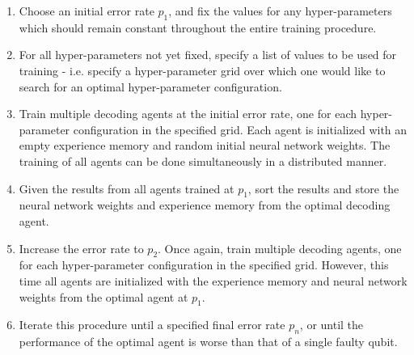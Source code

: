 \documentclass[twocolumn,preprintnumbers,amsmath,amssymb,notitlepage,nofootinbib,longbibliography,superscriptaddress,aps,pra,10pt]{revtex4-1}
\begin{document}
	\begin{enumerate}
		\item Choose an initial error rate $p_1$, and fix the values for any hyper-parameters which should remain constant throughout the entire training procedure.
		\item For all hyper-parameters not yet fixed, specify a list of values to be used for training - i.e. specify a hyper-parameter grid over which one would like to search for an optimal hyper-parameter configuration.
		\item Train multiple decoding agents at the initial error rate, one for each hyper-parameter configuration in the specified grid. Each agent is initialized with an empty experience memory and random initial neural network weights. The training of all agents can be done simultaneously in a distributed manner.
		\item Given the results from all agents trained at $p_1$, sort the results and store the neural network weights and experience memory from the optimal decoding agent.
		\item Increase the error rate to $p_2$. Once again, train multiple decoding agents, one for each hyper-parameter configuration in the specified grid. However, this time all agents are initialized with the experience memory and neural network weights from the optimal agent at $p_1$.
		\item Iterate this procedure until a specified final error rate $p_n$, or until the performance of the optimal agent is worse than that of a single faulty qubit.
	\end{enumerate}
\end{document}
